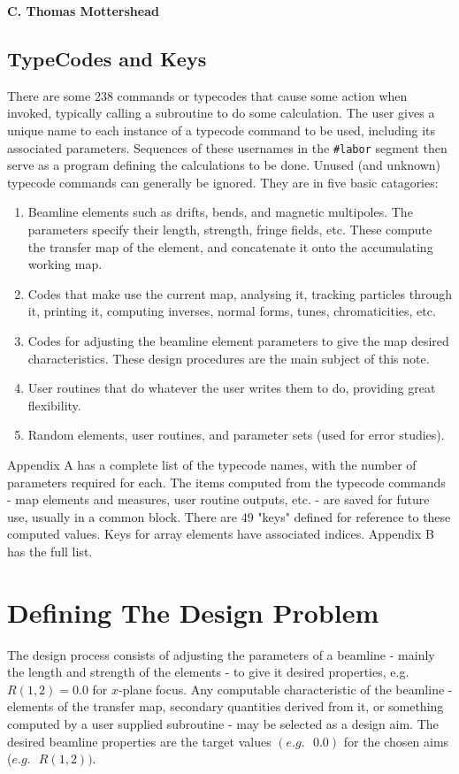 \documentclass[11pt]{article} %
\newcommand{\sub}{\subsection}
\newcommand{\vb}{\verb ;}
\newcommand{\benu}{\begin{enumerate}}
\newcommand{\enu}{\end{enumerate}}
\newcommand{\xx}{\mbox{~~} }
\begin{document}
\begin{center}  {\bf C. Thomas Mottershead }
\sub{TypeCodes and Keys}
 There are some 238 commands or typecodes that cause some action when invoked, typically calling a subroutine to do some calculation.  The user gives a unique name to each instance of a typecode command to be used, including its associated parameters. Sequences of these usernames in the \vb #labor; segment then serve as a program defining the calculations to be done. Unused (and unknown) typecode commands can generally be ignored. They are in five basic catagories: 
 \benu
\item  Beamline elements such as drifts, bends, and magnetic multipoles. The parameters specify their length, strength, fringe fields, etc. These compute the transfer map of the element, and concatenate it onto the accumulating working map. 
\item  Codes that make use the current map, analysing it, tracking particles through it, printing it, computing inverses, normal forms, tunes, chromaticities, etc. 
\item  Codes for adjusting the beamline element parameters to give the map desired characteristics. These design procedures are the main subject of this note.
 \item User routines that do whatever the user writes them to do, providing great flexibility. %
\item Random elements, user routines, and parameter sets (used for error studies).
\enu
 Appendix A has a complete list of the typecode names, with the number of parameters required for each.
The items computed from the typecode commands - map elements and measures, user routine outputs, etc. - are saved for future use, usually in a common block. There are 49 "keys" defined for reference to these computed values. Keys for array elements have associated indices. Appendix B has the full list. 


\section{Defining The Design Problem}
The design process consists of adjusting the parameters of a beamline - mainly the length and strength of the elements - to give it desired properties, e.g. $R(1,2)=0.0$ for $x$-plane focus.
Any computable characteristic of the beamline - elements of the transfer map, secondary quantities derived from it, or something computed by a user supplied subroutine - may be selected as a design aim.
The desired beamline properties are the target values $(e.g. \xx 0.0)$ for the chosen aims ($e.g. \xx R(1,2))$.


\end{center}
\end{document}
